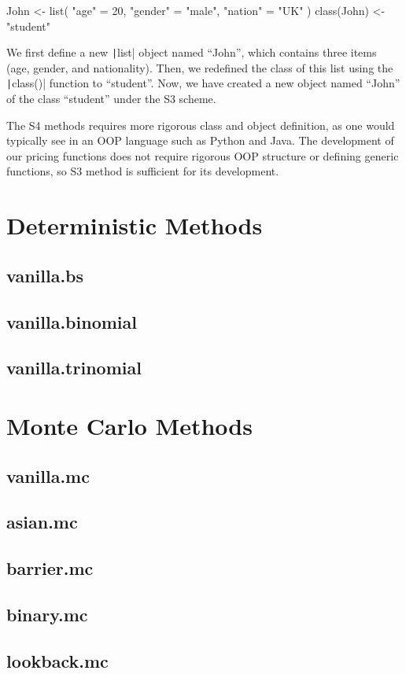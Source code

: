 \begin{Rminted}
John <- list(
    "age" = 20,
    "gender" = "male",
    "nation" = "UK"
)
class(John) <- "student"
\end{Rminted}

We first define a new \texttt|list| object named ``John'', which contains three items (age, gender, and nationality). Then, we redefined the class of this list using the \texttt|class()| function to ``student''. Now, we have created a new object named ``John'' of the class ``student'' under the S3 scheme.

The S4 methods requires more rigorous class and object definition, as one would typically see in an OOP language such as Python and Java. The development of our pricing functions does not require rigorous OOP structure or defining generic functions, so S3 method is sufficient for its development.

\section{Deterministic Methods}

\subsection{vanilla.bs}

\subsection{vanilla.binomial}

\subsection{vanilla.trinomial}

\section{Monte Carlo Methods}

\subsection{vanilla.mc}

\subsection{asian.mc}

\subsection{barrier.mc}

\subsection{binary.mc}

\subsection{lookback.mc}

\newpage